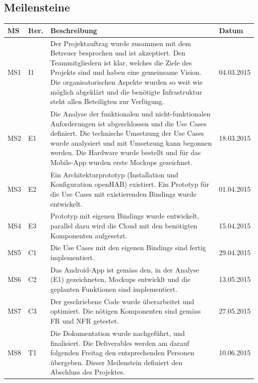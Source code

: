 	\subsection*{Meilensteine}
		\begin{tabularx}{\textwidth}{lp{1cm}Xl}
			\textbf{MS}	& \textbf{Iter.} & \textbf{Beschreibung} & \textbf{Datum}
			\\ \hline
				MS1 &
				I1 &
				Der Projektauftrag wurde zusammen mit dem Betreuer besprochen und ist akzeptiert. 
				Den Teammitgliedern ist klar, welches die Ziele des Projekts sind und haben eine gemeinsame Vision. 
				Die organisatorischen Aspekte wurden so weit wie möglich abgeklärt und die benötigte Infrastruktur 
				steht allen Beteiligten zur Verfügung. &
				04.03.2015
			\\ \hline		
				MS2 &
				E1 &
				Die Analyse der funktionalen und nicht-funktionalen Anforderungen ist abgeschlossen und die Use Cases definiert. 
				Die technische Umsetzung der Use Cases wurde analysiert und mit Umsetzung kann begonnen werden. Die Hardware wurde 
				bestellt und für das Mobile-App wurden erste Mockups gezeichnet. &
				18.03.2015
			\\ \hline
				MS3 &
				E2 &
				Ein Architekturprototyp (Installation und Konfiguration openHAB) existiert. Ein Prototyp für die Use Cases mit 
				existierenden Bindings wurde entwickelt.	& 01.04.2015
			\\ \hline
				MS4 &
				E3 &
				Prototyp mit eigenen Bindings wurde entwickelt, parallel dazu wird die Cloud mit den benötigten Komponenten aufgesetzt. &
				15.04.2015
			\\ \hline
 				MS5 &
 				C1 &
 				Die Use Cases mit den eigenen Bindings sind fertig implementiert. &
 				29.04.2015
 			\\ \hline
				MS6	&
				C2 &
				Das Android-App ist gemäss den, in der Analyse (E1) gezeichneten, Mockups entwicklt und die geplanten Funktionen sind implementiert. &
				13.05.2015
			\\ \hline
 				MS7 &
 				C3 &
 				Der geschriebene Code wurde überarbeitet und optimiert. Die nötigen Komponenten sind gemäss FR und NFR getestet. &
 				27.05.2015
 			\\ \hline
				MS8 &
				T1 &
				Die Dokumentation wurde nachgeführt, und finalisiert. Die Deliverables werden am darauf folgenden Freitag den entsprechenden 
				Personen übergeben. Dieser Meilenstein definiert den Abschluss des Projektes. &
				10.06.2015
			\\ \hline
		\end{tabularx}

